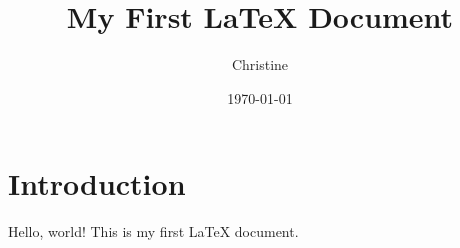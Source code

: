 \documentclass{article}
\title{My First LaTeX Document}
\author{Christine}
\date{\today}
\begin{document}
\maketitle

\section{Introduction}
Hello, world! This is my first \LaTeX{} document.
\end{document}
